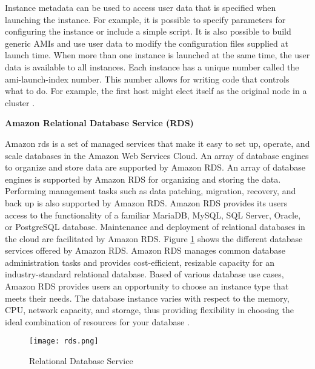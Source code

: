 \par Instance metadata can be used to access user data that is specified when launching the instance. For example, it
is possible to specify parameters for configuring the instance or include a simple script. It is also possible to
build generic AMIs and use user data to modify the configuration files supplied at launch time.
When more than one instance is launched at the same time,
the user data is available to all instances.
Each instance has a unique number called the ami-launch-index number.
This number allows for writing code that controls what to
do.
For example, the first host might elect itself as the original node in a cluster \cite{34}.


\hfill \break

\textbf{Amazon Relational Database Service (RDS)}

\par Amazon \gls{rds} is a set of managed services that
make it
easy
to
set up, operate, and scale databases in the Amazon Web Services Cloud.
An array of database engines to organize and store data
are supported by Amazon RDS.
An array of database engines is supported by Amazon RDS for organizing and storing the data.
Performing management tasks such as data patching, migration, recovery, and back up is also supported by Amazon RDS.
Amazon RDS provides its users access to the functionality of a familiar MariaDB, MySQL, SQL Server, Oracle, or PostgreSQL database.
Maintenance and deployment of relational databases in the cloud are facilitated by Amazon RDS.
Figure \ref{fig:rds} shows the different database
services offered by Amazon RDS. Amazon RDS manages common database administration tasks and provides cost-efficient, resizable capacity for an industry-standard relational database.
Based of various database use cases, Amazon RDS provides users an opportunity to choose an instance type that meets their needs.
The database instance varies with respect to the memory,
CPU, network capacity, and storage, thus providing
flexibility in choosing the ideal combination of resources for your database \cite{35}.
\begin{figure}
    \centering
    \texttt{[image: rds.png]}
    \caption{Relational Database Service}{\cite{36}}
    \label{fig:rds}
\end{figure}


